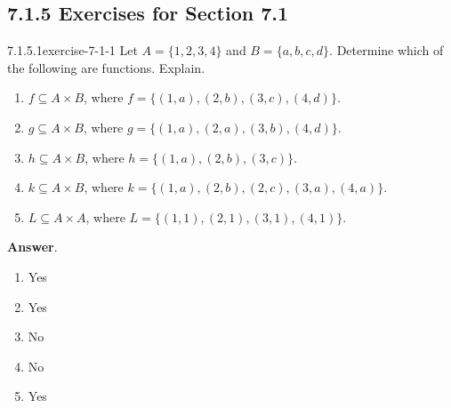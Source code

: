\documentclass[twoside,10pt,]{book}
\numberwithin{equation}{section}
\begin{document}
\subsection*{7.1.5 Exercises for Section 7.1}
\begin{divisionsolution}{7.1.5.1}{}{exercise-7-1-1}%
\hypertarget{p-2272}{}%
Let \(A = \{1, 2, 3, 4\}\) and \(B = \{a, b, c, d\}\). Determine which of the following are functions. Explain.%
\par
\hypertarget{p-2273}{}%
\leavevmode%
\begin{enumerate}[label=(\alph*)]
\item\hypertarget{li-1176}{}\hypertarget{p-2274}{}%
\(f \subseteq  A \times  B\), where \(f = \{(1, a), (2, b), (3, c), (4, d)\}\).%
\item\hypertarget{li-1177}{}\hypertarget{p-2275}{}%
\(g\subseteq A\times B\), where \(g = \{(1, a), (2, a), (3,b), (4,d)\}\).%
\item\hypertarget{li-1178}{}\hypertarget{p-2276}{}%
\(h \subseteq A \times  B\), where \(h = \{(1, a), (2, b), (3, c)\}\).%
\item\hypertarget{li-1179}{}\hypertarget{p-2277}{}%
\(k \subseteq A\times  B\), where \(k = \{(1, a), (2, b), (2, c), (3, a), (4, a)\}\).%
\item\hypertarget{li-1180}{}\hypertarget{p-2278}{}%
\(L\subseteq A\times A\), where \(L = \{(1, 1), (2, 1), (3, 1), (4, 1)\}\).%
\end{enumerate}
%
\par\smallskip%
\noindent\textbf{Answer}.\quad%
\hypertarget{p-2279}{}%
\leavevmode%
\begin{multicols}{3}
\begin{enumerate}[label=(\alph*)]
\item\hypertarget{li-1181}{}\hypertarget{p-2280}{}%
Yes%
\item\hypertarget{li-1182}{}\hypertarget{p-2281}{}%
Yes%
\item\hypertarget{li-1183}{}\hypertarget{p-2282}{}%
No%
\item\hypertarget{li-1184}{}\hypertarget{p-2283}{}%
No%
\item\hypertarget{li-1185}{}\hypertarget{p-2284}{}%
Yes%
\end{enumerate}
\end{multicols}
%
\end{divisionsolution}%
\end{document}
